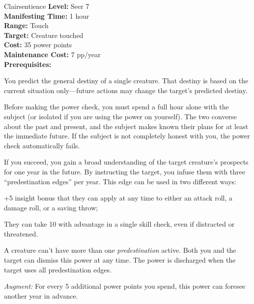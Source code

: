 {Clairsentience}
{
	\textbf{Level:}
	Seer 7\\
	\textbf{Manifesting Time:}
	1 hour\\
	\textbf{Range:}
	Touch\\
	\textbf{Target:}
	Creature touched\\
	\textbf{Cost:}
	35 power points\\
	\textbf{Maintenance Cost:}
	7 pp/year\\
	\textbf{Prerequisites:}
	\\
}
{
	You predict the general destiny of a single creature. That destiny is based on the current situation only---future actions may change the target's predicted destiny.

	Before making the power check, you must spend a full hour alone with the subject (or isolated if you are using the power on yourself). The two converse about the past and present, and the subject makes known their plans for at least the immediate future. If the subject is not completely honest with you, the power check automatically fails.

	If you succeed, you gain a broad understanding of the target creature's prospects for one year in the future. By instructing the target, you infuse them with three ``predestination edges'' per year. This edge can be used in two different ways:
	\begin{enumerate*}
	\item +5 insight bonus that they can apply at any time to either an attack roll, a damage roll, or a saving throw;
	\item They can take 10 with advantage in a single skill check, even if distracted or threatened.
	\end{enumerate*}

	A creature can't have more than one \emph{predestination} active. Both you and the target can dismiss this power at any time. The power is discharged when the target uses all predestination edges.

	\textit{Augment:} For every 5 additional power points you spend, this power can foresee another year in advance.
}